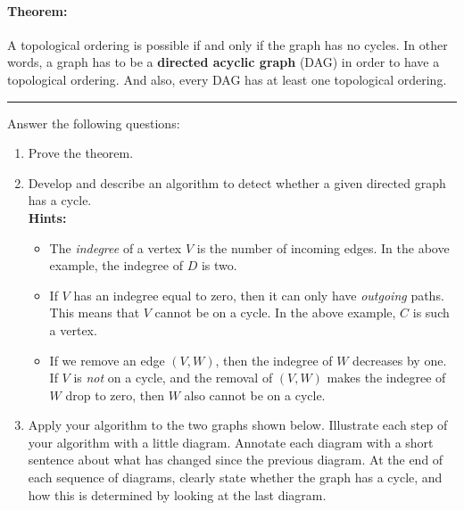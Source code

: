 \documentclass[a4paper]{article}
\newcounter{question}
\begin{document}
\begin{center}
\end{center}

\paragraph{Theorem:}
A topological ordering is possible if and only if the graph has no cycles.
In other words, a graph has to be a \textbf{directed acyclic graph} (DAG) in order to have a topological ordering.
And also, every DAG has at least one topological ordering.

\vspace{\baselineskip}
\noindent\hrule
\vspace{\baselineskip}

\noindent
Answer the following questions:

\begin{enumerate}
\item
  Prove the theorem.
\item
  Develop and describe an algorithm to detect whether a given directed graph has a cycle.\\
  \textbf{Hints:}
  \begin{itemize}
  \item
    The \emph{indegree} of a vertex $V$ is the number of incoming edges.
    In the above example, the indegree of $D$ is two.
  \item
    If $V$ has an indegree equal to zero, then it can only have \emph{outgoing} paths.
    This means that $V$ cannot be on a cycle.
    In the above example, $C$ is such a vertex.
  \item
    If we remove an edge $(V,W)$, then the indegree of $W$ decreases by one.
    If $V$ is \emph{not} on a cycle, and the removal of $(V,W)$ makes the indegree of $W$ drop to zero, then $W$ also cannot be on a cycle.
  \end{itemize}
\item
  Apply your algorithm to the two graphs shown below.
  Illustrate each step of your algorithm with a little diagram.
  Annotate each diagram with a short sentence about what has changed since the previous diagram.
  At the end of each sequence of diagrams, clearly state whether the graph has a cycle, and how this is determined by looking at the last diagram.
\end{enumerate}
\end{document}
